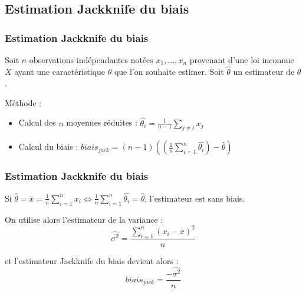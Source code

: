 \documentclass[handout]{beamer}
\begin{document}
		\subsection{Estimation Jackknife du biais}
		\begin{frame}
			\frametitle{Estimation Jackknife du biais}
			Soit $n$ observations indépendantes notées $x_1, \dots, x_n$ provenant d'une loi inconnue $X$ ayant une caractéristique $\theta$ que l'on souhaite estimer. Soit $\hat{\theta}$ un estimateur de $\theta$.

			\vspace{15px}
			Méthode :
			\begin{itemize}
				\item Calcul des $n$ moyennes réduites : $\hat{\theta_i} = \frac{1}{n - 1}\sum\limits_{j \neq i } x_j$
				\item Calcul du biais : $biais_{jack} = (n - 1)((\frac{1}{n} \sum\limits_{i=1}^n \hat{\theta_i}) - \hat{\theta})$
			\end{itemize}


		\end{frame}

		\begin{frame}
			\frametitle{Estimation Jackknife du biais}
			Si $\hat{\theta} = \overline{x} = \frac{1}{n} \sum\limits_{i=1}^n x_i \Leftrightarrow \frac{1}{n} \sum\limits_{i=1}^n \hat{\theta_i} = \hat{\theta}$, l'estimateur est sans biais.

			\vspace{15px}
			On utilise alors l'estimateur de la variance :
			\[\hat{\sigma^2} = \frac{\sum\limits_{i=1}^n (x_i - \overline{x})^2}{n} \]

			et l'estimateur Jackknife du biais devient alors :
			\[biais_{jack} = \frac{-\hat{\sigma^2}}{n} \]
		\end{frame}


\end{document}
